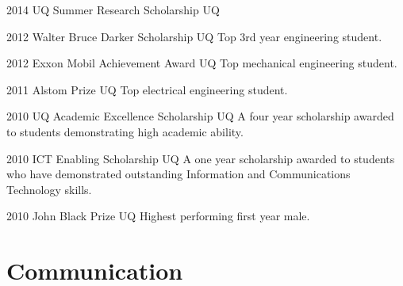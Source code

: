 \documentclass[]{friggeri-cv} %
\begin{document}
\begin{entrylist}
\entryInlineSmall
    {2014}
    {UQ Summer Research Scholarship}
    {UQ}
    {}
\end{entrylist}
\begin{entrylist}
\entryInlineSmall
    {2012}
    {Walter Bruce Darker Scholarship}
    {UQ}
    {Top 3rd year engineering student.}
\end{entrylist}
\begin{entrylist}
\entryInlineSmall
    {2012}
    {Exxon Mobil Achievement Award}
    {UQ}
    {Top mechanical engineering student.}
\end{entrylist}
\begin{entrylist}
\entryInlineSmall
    {2011}
    {Alstom Prize}
    {UQ}
    {Top electrical engineering student.}
\end{entrylist}
\begin{entrylist}
\entryInlineSmall
    {2010}
    {UQ Academic Excellence Scholarship}
    {UQ}
    {A four year scholarship awarded to students demonstrating high academic ability.}
\end{entrylist}
\begin{entrylist}
\entryInlineSmall
    {2010}
    {ICT Enabling Scholarship}
    {UQ}
    {A one year scholarship awarded to students who have demonstrated outstanding Information and Communications Technology skills.}
\end{entrylist}
\begin{entrylist}
\entryInlineSmall
    {2010}
    {John Black Prize}
    {UQ}
    {Highest performing first year male.}
\end{entrylist}
















\section{Communication}
\end{document}

